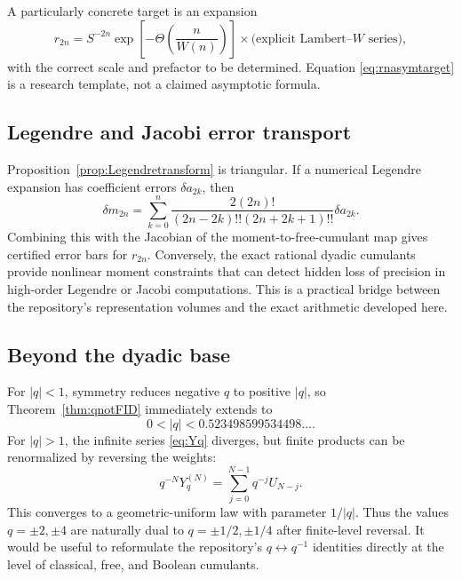 \documentclass[11pt]{article}
\theoremstyle{definition}
\begin{document}
A particularly concrete target is an expansion
\begin{equation}\label{eq:rnasymtarget}
r_{2n}=S^{-2n}\exp\!\left[-\Theta\!\left(\frac{n}{W(n)}\right)\right]
\times\bigl(\text{explicit Lambert--\(W\) series}\bigr),
\end{equation}
with the correct scale and prefactor to be determined. Equation \eqref{eq:rnasymtarget} is a research template, not a claimed asymptotic formula.

\subsection{Legendre and Jacobi error transport}
Proposition~\ref{prop:Legendretransform} is triangular. If a numerical Legendre expansion has coefficient errors \(\delta a_{2k}\), then
\[
\delta m_{2n}=\sum_{k=0}^n
\frac{2(2n)!}{(2n-2k)!!(2n+2k+1)!!}\delta a_{2k}.
\]
Combining this with the Jacobian of the moment-to-free-cumulant map gives certified error bars for \(r_{2n}\). Conversely, the exact rational dyadic cumulants provide nonlinear moment constraints that can detect hidden loss of precision in high-order Legendre or Jacobi computations. This is a practical bridge between the repository's representation volumes and the exact arithmetic developed here.

\subsection{Beyond the dyadic base}
For \(|q|<1\), symmetry reduces negative \(q\) to positive \(|q|\), so Theorem~\ref{thm:qnotFID} immediately extends to
\[
0<|q|<0.523498599534498\ldots.
\]
For \(|q|>1\), the infinite series \eqref{eq:Yq} diverges, but finite products can be renormalized by reversing the weights:
\[
q^{-N}Y_q^{(N)}=\sum_{j=0}^{N-1}q^{-j}U_{N-j}.
\]
This converges to a geometric-uniform law with parameter \(1/|q|\). Thus the values \(q=\pm2,\pm4\) are naturally dual to \(q=\pm1/2,\pm1/4\) after finite-level reversal. It would be useful to reformulate the repository's \(q\leftrightarrow q^{-1}\) identities directly at the level of classical, free, and Boolean cumulants.
\end{document}
